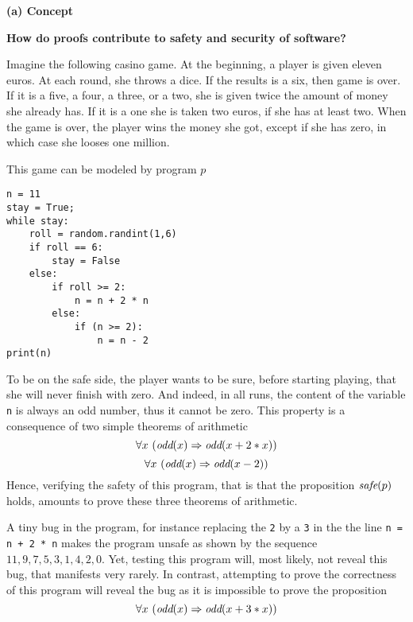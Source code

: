 {\bf (a) Concept}

\begin{framed}
\begin{center}
{\bf How do proofs contribute to safety and security of software?}
\end{center}
  
Imagine the following casino game. At the beginning, a player is given
eleven euros. At each round, she throws a dice. If the results is a
six, then game is over.  If it is a five, a four, a three, or a two,
she is given twice the amount of money she already has. If it is a one
she is taken two euros, if she has at least two.  When the game is
over, the player wins the money she got, except if she has zero, in
which case she looses one million.

This game can be modeled by program $p$
\begin{verbatim}
n = 11
stay = True;
while stay: 
    roll = random.randint(1,6)
    if roll == 6:
        stay = False
    else:
        if roll >= 2:
            n = n + 2 * n
        else:
            if (n >= 2):
                n = n - 2
print(n)
\end{verbatim}

To be on the safe side, the player wants to be sure, before starting
playing, that she will never finish with zero.  And indeed, in all runs,
the content of the variable {\tt n} is always an odd number, thus it
cannot be zero. This property is a consequence of two simple
theorems of arithmetic
$$\forall x~(\mbox{\it odd}(x) \Rightarrow \mbox{\it odd}(x + 2 * x))$$
$$\forall x~(\mbox{\it odd}(x) \Rightarrow \mbox{\it odd}(x - 2))$$
Hence, verifying the safety of this program, that is that the
proposition 
${\mbox{\it safe}}(p)$ holds, 
amounts to prove these three theorems of arithmetic.

A tiny bug in the program, for instance replacing the {\tt 2} by a
{\tt 3} in the the line {\tt n = n + 2 * n} makes the program unsafe
as shown by the sequence $11, 9, 7, 5, 3, 1, 4, 2, 0$. Yet, testing
this program will, most likely, not reveal this bug, that manifests
very rarely.  In contrast, attempting to prove the correctness of this
program will
reveal the bug as it is impossible to prove the proposition
$$\forall x~(\mbox{\it odd}(x) \Rightarrow \mbox{\it odd}(x + 3 * x))$$
\end{framed}
\pagebreak
